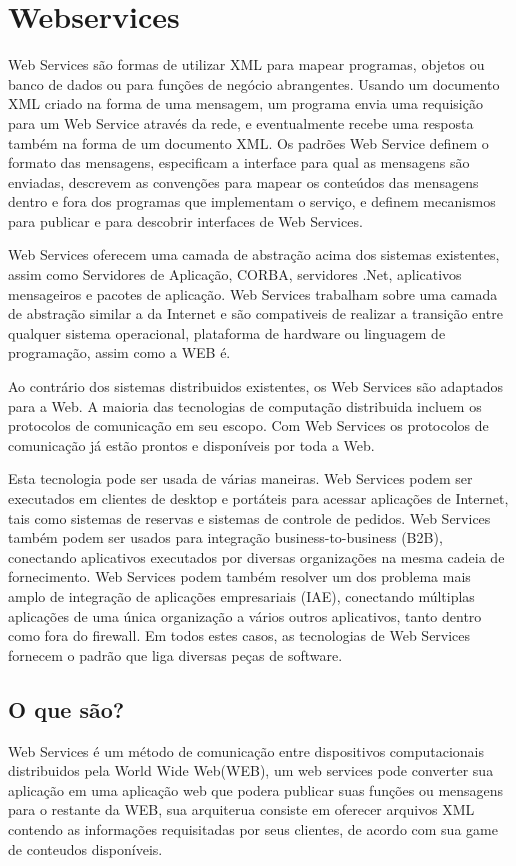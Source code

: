 \documentclass{acm_proc_article-sp}
\begin{document}
\section{Webservices}
		
		Web Services são formas de utilizar XML para mapear programas, objetos ou banco de dados ou para funções de negócio abrangentes. Usando um documento XML criado na forma de uma mensagem, um programa envia uma requisição para um Web Service através da rede, e eventualmente recebe uma resposta também na forma de um documento XML. Os padrões Web Service definem o formato das mensagens, especificam a interface para qual as mensagens são enviadas, descrevem as convenções para mapear os conteúdos das mensagens dentro e fora dos programas que implementam o serviço, e definem mecanismos para publicar e para descobrir interfaces de Web Services.
		
		Web Services oferecem uma camada de abstração acima dos sistemas existentes, assim como Servidores de Aplicação, CORBA, servidores .Net, aplicativos mensageiros e pacotes de aplicação. Web Services trabalham sobre 
		uma camada de abstração similar a da Internet e são compativeis de realizar a transição entre qualquer sistema operacional, plataforma de hardware ou linguagem de programação, assim como a WEB é.
		
		Ao contrário dos sistemas distribuidos existentes, os Web Services são adaptados para a Web. A maioria das tecnologias de computação distribuida incluem os protocolos de comunicação em seu escopo. Com Web Services os protocolos de comunicação já estão prontos e disponíveis por toda a Web. 
		
		Esta tecnologia pode ser usada de várias maneiras. Web Services podem ser executados em clientes de desktop e portáteis para acessar aplicações de Internet, tais como sistemas de reservas e sistemas de controle de pedidos. Web Services também podem ser usados para integração business-to-business (B2B), conectando aplicativos executados por diversas organizações na mesma cadeia de fornecimento. Web Services podem também resolver um dos problema mais amplo de integração de aplicações empresariais (IAE), conectando múltiplas aplicações de uma única organização a vários outros aplicativos, tanto dentro como fora do firewall. Em todos estes casos, as tecnologias de Web Services fornecem o padrão que liga diversas peças de software.
		
		\cite{UNDERWEBSERVICES}

	\subsection{O que são?}
		Web Services é um método de comunicação entre dispositivos computacionais distribuidos pela World Wide Web(WEB), um web services pode converter sua aplicação em uma aplicação web que podera publicar suas funções ou mensagens para o restante da WEB, sua arquiterua consiste em oferecer arquivos XML contendo as informações requisitadas por seus clientes, de acordo com sua game de conteudos disponíveis.\cite{WEBS}
		
\end{document}

